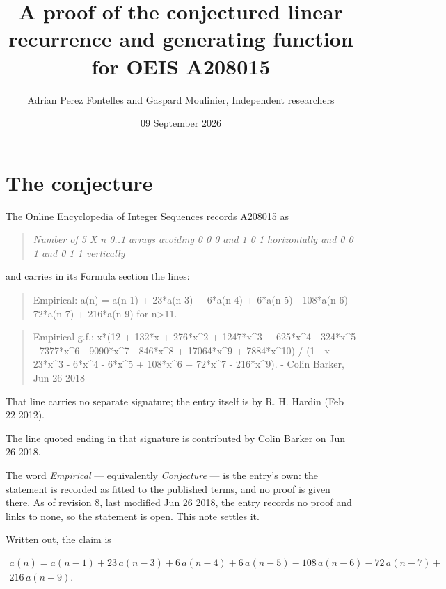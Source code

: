 \documentclass[11pt]{article}
\title{A proof of the conjectured linear recurrence and generating function for OEIS A208015}
\author{Adrian Perez Fontelles and Gaspard Moulinier, Independent researchers}
\date{09 September 2026}
\theoremstyle{definition}
\begin{document}
\maketitle
\section{The conjecture}

The Online Encyclopedia of Integer Sequences records \href{https://oeis.org/A208015}{A208015} as

\begin{quote}\itshape Number of 5 X n 0..1 arrays avoiding 0 0 0 and 1 0 1 horizontally and 0 0 1 and 0 1 1 vertically\end{quote}

and carries in its Formula section the lines:

\begin{quote}\ttfamily Empirical: a(n) = a(n-1) + 23*a(n-3) + 6*a(n-4) + 6*a(n-5) - 108*a(n-6) - 72*a(n-7) + 216*a(n-9) for n>11.\end{quote}

\begin{quote}\ttfamily Empirical g.f.: x*(12 + 132*x + 276*x\textasciicircum{}2 + 1247*x\textasciicircum{}3 + 625*x\textasciicircum{}4 - 324*x\textasciicircum{}5 - 7377*x\textasciicircum{}6 - 9090*x\textasciicircum{}7 - 846*x\textasciicircum{}8 + 17064*x\textasciicircum{}9 + 7884*x\textasciicircum{}10) / (1 - x - 23*x\textasciicircum{}3 - 6*x\textasciicircum{}4 - 6*x\textasciicircum{}5 + 108*x\textasciicircum{}6 + 72*x\textasciicircum{}7 - 216*x\textasciicircum{}9). - Colin Barker, Jun 26 2018\end{quote}

That line carries no separate signature; the entry itself is by R. H. Hardin (Feb 22 2012).

The line quoted ending in that signature is contributed by Colin Barker on Jun 26 2018.

The word {\itshape Empirical} --- equivalently {\itshape Conjecture} --- is the entry's own: the statement is recorded as fitted to the published terms, and no proof is given there. As of revision 8, last modified Jun 26 2018, the entry records no proof and links to none, so the statement is open. This note settles it.

Written out, the claim is

\begin{multline*} a(n) = a(n-1) + 23\,a(n-3) + 6\,a(n-4) + 6\,a(n-5) - 108\,a(n-6) - 72\,a(n-7) + \\ 216\,a(n-9). \end{multline*}
\end{document}
